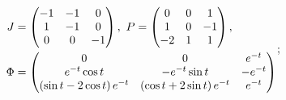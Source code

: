 \begin{enumsolsfull}
		\item \( \begin{aligned} J &= \begin{pmatrix} -1 & -1 & 0 \\ 1 & -1 & 0 \\ 0 & 0 & -1 \end{pmatrix}, ~ P = \begin{pmatrix} 0 & 0 & 1 \\ 1 & 0 & -1 \\ -2 & 1 & 1 \end{pmatrix}, \\ \Phi &= \begin{pmatrix} 0 & 0 & e^{-t} \\ e^{-t} \cos{t} & -e^{-t} \sin{t} & -e^{-t} \\ \left( \sin{t} - 2 \cos{t} \right) e^{-t} & \left( \cos{t} + 2 \sin{t} \right) e^{-t} & e^{-t} \end{pmatrix} \end{aligned} \); %

\end{enumsolsfull}
